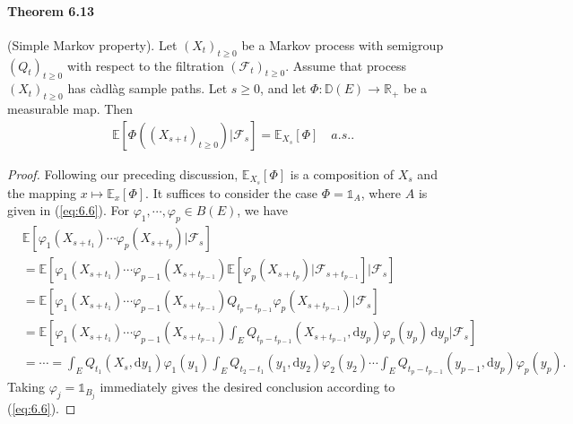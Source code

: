 \documentclass{article}
\numberwithin{equation}{section}
\newcommand{\E}{\mathbb{E}}
\renewcommand{\d}{\mathrm{d}}
\theoremstyle{plain}
\theoremstyle{definition}
\begin{document}
\paragraph{Theorem 6.13\label{thm:6.13}} (Simple Markov property). Let $(X_t)_{t\geq 0}$ be a Markov process with semigroup $(Q_t)_{t\geq 0}$ with respect to the filtration $(\mathscr{F}_t)_{t\geq 0}$. Assume that process $(X_t)_{t\geq 0}$ has càdlàg sample paths. Let $s\geq 0$, and let $\Phi:\mathbb{D}(E)\to\mathbb{R}_+$ be a measurable map. Then
\begin{align*}
	\E\left[\Phi((X_{s+t})_{t\geq 0})|\mathscr{F}_s\right]=\E_{X_s}[\Phi]\quad a.s..
\end{align*}
\begin{proof}
Following our preceding discussion, $\E_{X_s}[\Phi]$ is a composition of $X_s$ and the mapping $x\mapsto \E_x[\Phi]$. It suffices to consider the case $\Phi=\mathds{1}_A$, where $A$ is given in (\ref{eq:6.6}). For $\varphi_1,\cdots,\varphi_p\in B(E)$, we have
\begin{align*}
	&\E\left[\varphi_1(X_{s+t_1})\cdots\varphi_p(X_{s+t_p})|\mathscr{F}_s\right] \\
	&= \E\left[\varphi_1(X_{s+t_1})\cdots\varphi_{p-1}(X_{s+t_{p-1}})\E\left[\varphi_p(X_{s+t_p})|\mathscr{F}_{s+t_{p-1}}\right]|\mathscr{F}_s\right]\\
	&= \E\left[\varphi_1(X_{s+t_1})\cdots\varphi_{p-1}(X_{s+t_{p-1}}) Q_{t_p-t_{p-1}}\varphi_p(X_{s+t_{p-1}})|\mathscr{F}_s\right]\\
	&=\E\left[\varphi_1(X_{s+t_1})\cdots\varphi_{p-1}(X_{s+t_{p-1}}) \int_E Q_{t_p-t_{p-1}}(X_{s+t_{p-1}},\d y_p)\varphi_p(y_p)\,\d y_p|\mathscr{F}_s\right]\\
	&=\cdots = \int_E Q_{t_1}(X_s,\d y_1)\varphi_1(y_1)\int_E Q_{t_2-t_1}(y_1,\d y_2)\varphi_2(y_2)\cdots\int_E Q_{t_p-t_{p-1}}(y_{p-1},\d y_p)\varphi_p(y_p).
\end{align*}
Taking $\varphi_j=\mathds{1}_{B_j}$ immediately gives the desired conclusion according to (\ref{eq:6.6}).
\end{proof}
\end{document}
